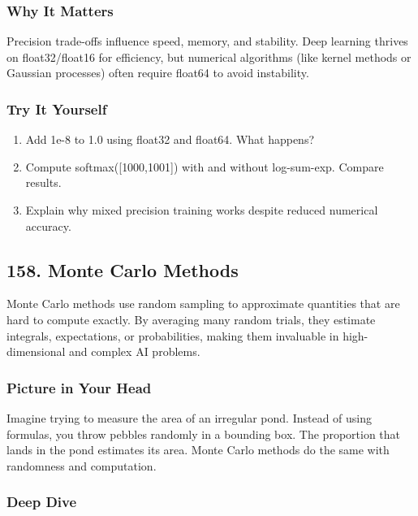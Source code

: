\documentclass[
  letterpaper,
  DIV=11,
  numbers=noendperiod]{scrreprt}
\providecommand{\tightlist}{%
  \setlength{\itemsep}{0pt}\setlength{\parskip}{0pt}}
\begin{document}
\subsubsection{Why It Matters}\label{why-it-matters-54}

Precision trade-offs influence speed, memory, and stability. Deep
learning thrives on float32/float16 for efficiency, but numerical
algorithms (like kernel methods or Gaussian processes) often require
float64 to avoid instability.

\subsubsection{Try It Yourself}\label{try-it-yourself-156}

\begin{enumerate}
\def\labelenumi{\arabic{enumi}.}
\tightlist
\item
  Add 1e-8 to 1.0 using float32 and float64. What happens?
\item
  Compute softmax({[}1000,1001{]}) with and without log-sum-exp. Compare
  results.
\item
  Explain why mixed precision training works despite reduced numerical
  accuracy.
\end{enumerate}

\subsection{158. Monte Carlo Methods}\label{monte-carlo-methods}

Monte Carlo methods use random sampling to approximate quantities that
are hard to compute exactly. By averaging many random trials, they
estimate integrals, expectations, or probabilities, making them
invaluable in high-dimensional and complex AI problems.

\subsubsection{Picture in Your Head}\label{picture-in-your-head-157}

Imagine trying to measure the area of an irregular pond. Instead of
using formulas, you throw pebbles randomly in a bounding box. The
proportion that lands in the pond estimates its area. Monte Carlo
methods do the same with randomness and computation.

\subsubsection{Deep Dive}\label{deep-dive-157}
\end{document}
